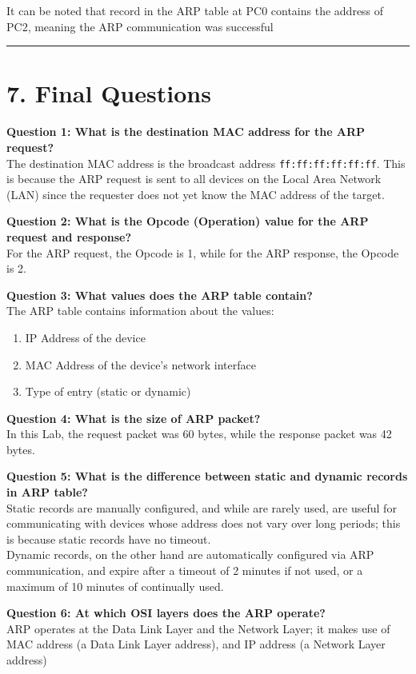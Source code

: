 \documentclass[a4paper,12pt]{article}
\begin{document}
It can be noted that record in the ARP table at PC0 contains the address of PC2, meaning the ARP communication was successful

\vspace{1em}
\hrule
\vspace{0.5em}
\pagebreak

\section*{7. Final Questions}

\textbf{Question 1: What is the destination MAC address for the ARP request?} \\
The destination MAC address is the broadcast address \texttt{ff:ff:ff:ff:ff:ff}. This is because the ARP request is sent to all devices on the Local Area Network (LAN) since the requester does not yet know the MAC address of the target.

\textbf{Question 2: What is the Opcode (Operation) value for the ARP request and response?}\\
For the ARP request, the Opcode is 1, while for the ARP response, the Opcode is 2.

\textbf{Question 3: What values does the ARP table contain?} \\
The ARP table contains information about the values:
\begin{enumerate}
    \item IP Address of the device
    \item MAC Address of the device's network interface
    \item Type of entry (static or dynamic)
\end{enumerate}
\textbf{Question 4: What is the size of ARP packet?}\\
In this Lab, the request packet was 60 bytes, while the response packet was 42 bytes.

\textbf{Question 5: What is the difference between static and dynamic records in ARP table?} \\
Static records are manually configured, and while are rarely used, are useful for communicating with devices whose address does not vary over long periods; this is because static records have no timeout.\\
Dynamic records, on the other hand are automatically configured via ARP communication, and expire after a timeout of 2 minutes if not used, or a maximum of 10 minutes of continually used.

\textbf{Question 6: At which OSI layers does the ARP operate?} \\
ARP operates at the Data Link Layer and the Network Layer; it makes use of MAC address (a Data Link Layer address), and IP address (a Network Layer address)
\end{document}
